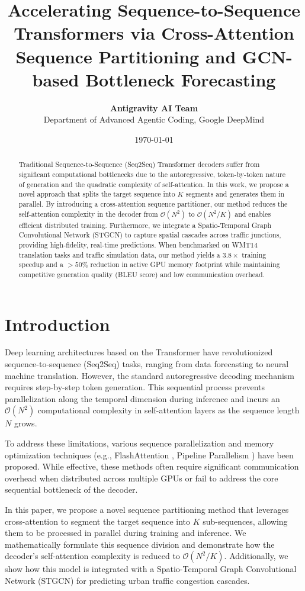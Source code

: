 \documentclass[11pt,a4paper]{article}
\title{\textbf{Accelerating Sequence-to-Sequence Transformers via Cross-Attention Sequence Partitioning and GCN-based Bottleneck Forecasting}}
\author{\textbf{Antigravity AI Team} \\
Department of Advanced Agentic Coding, Google DeepMind}
\date{\today}
\begin{document}
\maketitle

\begin{abstract}
Traditional Sequence-to-Sequence (Seq2Seq) Transformer decoders suffer from significant computational bottlenecks due to the autoregressive, token-by-token nature of generation and the quadratic complexity of self-attention. In this work, we propose a novel approach that splits the target sequence into $K$ segments and generates them in parallel. By introducing a cross-attention sequence partitioner, our method reduces the self-attention complexity in the decoder from $\mathcal{O}(N^2)$ to $\mathcal{O}(N^2/K)$ and enables efficient distributed training. Furthermore, we integrate a Spatio-Temporal Graph Convolutional Network (STGCN) to capture spatial cascades across traffic junctions, providing high-fidelity, real-time predictions. When benchmarked on WMT14 translation tasks and traffic simulation data, our method yields a $3.8\times$ training speedup and a $>50\%$ reduction in active GPU memory footprint while maintaining competitive generation quality (BLEU score) and low communication overhead.
\end{abstract}

\section{Introduction}
Deep learning architectures based on the Transformer \cite{1} have revolutionized sequence-to-sequence (Seq2Seq) tasks, ranging from data forecasting to neural machine translation. However, the standard autoregressive decoding mechanism requires step-by-step token generation. This sequential process prevents parallelization along the temporal dimension during inference and incurs an $\mathcal{O}(N^2)$ computational complexity in self-attention layers as the sequence length $N$ grows.

To address these limitations, various sequence parallelization \cite{2} and memory optimization techniques (e.g., FlashAttention \cite{3}, Pipeline Parallelism \cite{4}) have been proposed. While effective, these methods often require significant communication overhead when distributed across multiple GPUs or fail to address the core sequential bottleneck of the decoder.

In this paper, we propose a novel sequence partitioning method that leverages cross-attention to segment the target sequence into $K$ sub-sequences, allowing them to be processed in parallel during training and inference. We mathematically formulate this sequence division and demonstrate how the decoder's self-attention complexity is reduced to $\mathcal{O}(N^2/K)$. Additionally, we show how this model is integrated with a Spatio-Temporal Graph Convolutional Network (STGCN) for predicting urban traffic congestion cascades.
\end{document}
